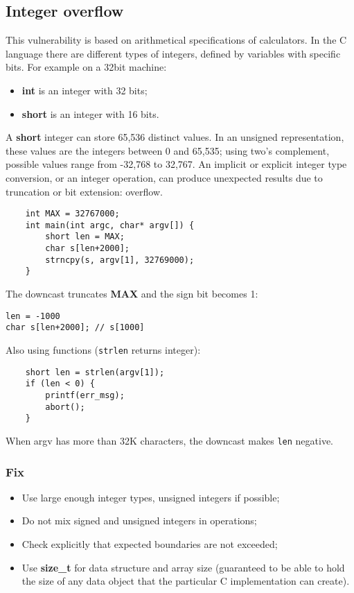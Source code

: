 \documentclass[a4paper, 10pt, titlepage]{article}
\begin{document}
\subsection{Integer overflow}
This vulnerability is based on arithmetical specifications of calculators. In the C language there are different types of integers, defined by variables with specific bits. For example on a 32bit machine:
\begin{itemize}
\item \textbf{int} is an integer with 32 bits;
\item \textbf{short} is an integer with 16 bits.
\end{itemize}
A \textbf{short} integer can store 65,536 distinct values. In an unsigned representation, these values are the integers between 0 and 65,535; using two's complement, possible values range from -32,768 to 32,767.
An implicit or explicit integer type conversion, or an integer operation, can produce unexpected results due to truncation or bit extension: overflow.
\begin{lstlisting}
	int MAX = 32767000;
	int main(int argc, char* argv[]) {
		short len = MAX;
		char s[len+2000];
		strncpy(s, argv[1], 32769000);
	}
\end{lstlisting}
The downcast truncates \textbf{MAX} and the sign bit becomes 1:
\begin{verbatim}
len = -1000
char s[len+2000]; // s[1000]
\end{verbatim}
Also using functions (\lstinline|strlen| returns integer):
\begin{lstlisting}
	short len = strlen(argv[1]);
	if (len < 0) {
		printf(err_msg);
		abort();
	}
\end{lstlisting}
When argv has more than 32K characters, the downcast makes \lstinline|len| negative.

\subsubsection*{Fix}
\begin{itemize}
\item Use large enough integer types, unsigned integers if possible;
\item Do not mix signed and unsigned integers in operations;
\item Check explicitly that expected boundaries are not exceeded;
\item Use \textbf{size\_t} for data structure and array size (guaranteed to be able to hold the size of any data object that the particular C implementation can create).
\end{itemize}
\end{document}
